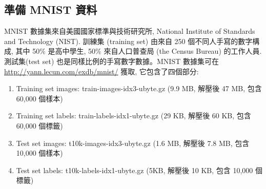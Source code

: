 \documentclass[a4paper,12pt]{article}
\begin{document}
\subsection{準備 MNIST 資料}
\label{sec:org6c76893}
MNIST 數據集來自美國國家標準與技術研究所, National Institute of Standards and Technology (NIST). 訓練集 (training set) 由來自 250 個不同人手寫的數字構成, 其中 50\% 是高中學生, 50\% 來自人口普查局 (the Census Bureau) 的工作人員. 測試集(test set) 也是同樣比例的手寫數字數據。MNIST 數據集可在 \url{http://yann.lecun.com/exdb/mnist/} 獲取, 它包含了四個部分:\\
\begin{enumerate}
\item Training set images: train-images-idx3-ubyte.gz (9.9 MB, 解壓後 47 MB, 包含 60,000 個樣本)\\
\item Training set labels: train-labels-idx1-ubyte.gz (29 KB, 解壓後 60 KB, 包含 60,000 個標籤)\\
\item Test set images: t10k-images-idx3-ubyte.gz (1.6 MB, 解壓後 7.8 MB, 包含 10,000 個樣本)\\
\item Test set labels: t10k-labels-idx1-ubyte.gz (5KB, 解壓後 10 KB, 包含 10,000 個標籤)\\
\end{enumerate}
\end{document}
